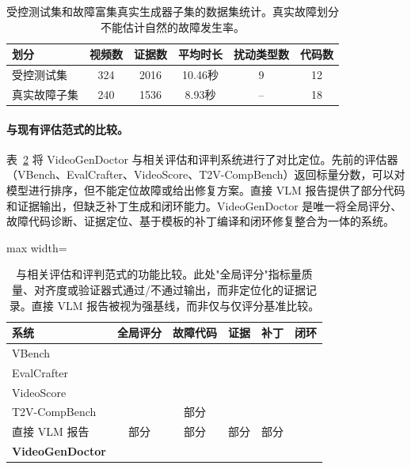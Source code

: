 \documentclass{article}
\newcommand{\cmark}{\ding{51}}
\newcommand{\xmark}{\ding{55}}
\begin{document}
\begin{table}[t]
\centering\small
\caption{受控测试集和故障富集真实生成器子集的数据集统计。真实故障划分不能估计自然的故障发生率。}
\label{tab:dataset_statistics}
\begin{tabular*}{0.95\textwidth}{@{\extracolsep{\fill}}lccccc@{}}
\toprule
\textbf{划分} & \textbf{视频数} & \textbf{证据数} & \textbf{平均时长} & \textbf{扰动类型数} & \textbf{代码数} \\
\midrule
受控测试集 & 324 & 2016 & 10.46秒 & 9 & 12 \\
真实故障子集 & 240 & 1536 & 8.93秒 & -- & 18 \\
\bottomrule
\end{tabular*}
\end{table}

\paragraph{与现有评估范式的比较。}
表~\ref{tab:comparison} 将 VideoGenDoctor 与相关评估和评判系统进行了对比定位。先前的评估器（VBench、EvalCrafter、VideoScore、T2V-CompBench）返回标量分数，可以对模型进行排序，但不能定位故障或给出修复方案。直接 VLM 报告提供了部分代码和证据输出，但缺乏补丁生成和闭环能力。VideoGenDoctor 是唯一将全局评分、故障代码诊断、证据定位、基于模板的补丁编译和闭环修复整合为一体的系统。

\begin{table}[t]
\centering\small
\caption{与相关评估和评判范式的功能比较。此处"全局评分"指标量质量、对齐度或验证器式通过/不通过输出，而非定位化的证据记录。直接 VLM 报告被视为强基线，而非仅与仅评分基准比较。}
\label{tab:comparison}
\begin{adjustbox}{max width=\textwidth}
\begin{tabular}{lccccc}
\toprule
\textbf{系统} & \textbf{全局评分} & \textbf{故障代码} & \textbf{证据} & \textbf{补丁} & \textbf{闭环} \\
\midrule
VBench & \cmark & \xmark & \xmark & \xmark & \xmark \\
EvalCrafter & \cmark & \xmark & \xmark & \xmark & \xmark \\
VideoScore & \cmark & \xmark & \xmark & \xmark & \xmark \\
T2V-CompBench & \cmark & 部分 & \xmark & \xmark & \xmark \\
直接 VLM 报告 & 部分 & 部分 & 部分 & 部分 & \xmark \\
\textbf{VideoGenDoctor} & \cmark & \cmark & \cmark & \cmark & \cmark \\
\bottomrule
\end{tabular}
\end{adjustbox}
\end{table}
\end{document}
